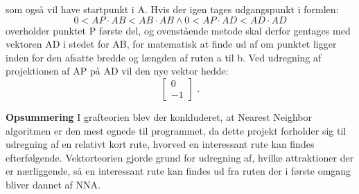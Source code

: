 som også vil have startpunkt i A. Hvis der igen tages udgangspunkt i formlen:\newline
\[0 < AP \cdot AB < AB \cdot AB \wedge 0 < AP \cdot AD < AD \cdot AD \]
overholder punktet P første del, og ovenstående metode skal derfor gentages med vektoren AD i stedet for AB, for matematisk at finde ud af om punktet ligger inden 	for den afsatte bredde og længden af ruten a til b. Ved udregning af projektionen af AP på AD vil den nye vektor hedde: \[ \begin{bmatrix} 0 \\ -1 \end{bmatrix} \text{ .} \]\newline

\textbf{Opsummering}\newline
I grafteorien blev der konkluderet, at Nearest Neighbor algoritmen er den mest egnede til programmet, da dette projekt forholder sig til udregning af en relativt kort rute, hvorved en interessant rute kan findes efterfølgende. Vektorteorien gjorde grund for udregning af, hvilke attraktioner der er nærliggende, så en interessant rute kan findes ud fra ruten der i første omgang bliver dannet af NNA.


